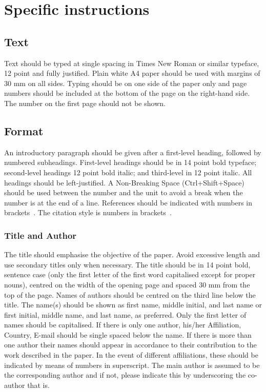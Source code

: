 \documentclass[12pt, a4paper]{article}
\begin{document}
\section{Specific instructions}

\subsection{Text}
Text should be typed at single spacing in Times New Roman or similar typeface, 12 point and fully justified. Plain white A4 paper should be used with margins of 30 mm on all sides. Typing should be on one side of the paper only and page numbers should be included at the bottom of the page on the right-hand side. The number on the first page should not be shown.

\subsection{Format}
An introductory paragraph should be given after a first-level heading, followed by numbered subheadings. First-level headings should be in 14 point bold typeface; second-level headings 12 point bold italic; and third-level in 12 point italic. All headings should be left-justified. A Non-Breaking Space (Ctrl+Shift+Space) should be used between the number and the unit to avoid a break when the number is at the end of a line. References should be indicated with numbers in brackets~\cite{Tan1977}. The citation style is numbers in brackets~\cite{Tan1977,Auld1979,Koehler2006}.

\subsubsection{Title and Author}
The title should emphasise the objective of the paper. Avoid excessive length and use secondary titles only when necessary. The title should be in 14 point bold, sentence case (only the first letter of the first word capitalised except for proper nouns), centred on the width of the opening page and spaced 30 mm from the top of the page. Names of authors should be centred on the third line below the title. The name(s) should be shown as first name, middle initial, and last name or first initial, middle name, and last name, as preferred. Only the first letter of names should be capitalised. If there is only one author, his/her Affiliation, Country, E-mail should be single spaced below the name. If there is more than one author their names should appear in accordance to their contribution to the work described in the paper. In the event of different affiliations, these should be indicated by means of numbers in superscript. The main author is assumed to be the corresponding author and if not, please indicate this by underscoring the co-author that is.
\end{document}
